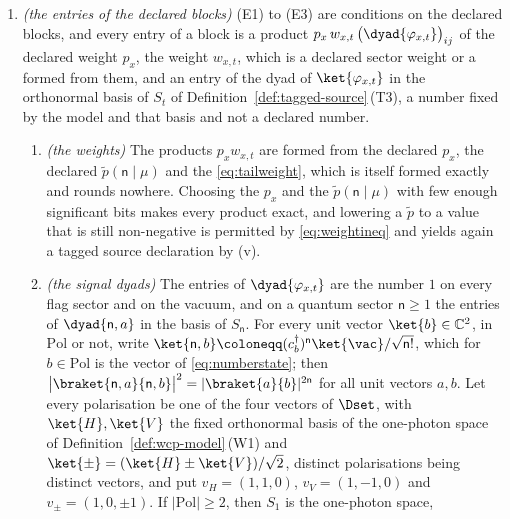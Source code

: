 \begin{corollary}
\begin{enumerate}[label=(\roman*),leftmargin=3.0em]
pinching $A$ along $\mathbb{T}$ after the attack is the same operation as
pinching the virtual signal before it (Lemma~\ref{lem:matched-pinching});
Theorem~\ref{thm:certificate-sufficiency}\,(iii) holds against the tagged ensemble of
Definition~\ref{def:tagged-source}\,(T4) itself;
and a positive operator constrained only to have the marginal $\tau_A$ need not
be block diagonal.
\item \emph{(the entries of the declared blocks)} (E1) to (E3) are conditions on
the declared blocks, and every entry of a block is a product
$p_x\,w_{x,t}\,\big(\dyad{\varphi_{x,t}}\big)_{ij}$ of the declared weight
$p_x$, the weight $w_{x,t}$, which is a declared sector weight or a
 formed from them, and an entry of the dyad of $\ket{\varphi_{x,t}}$ in the
orthonormal basis of $S_t$ of Definition~\ref{def:tagged-source}\,(T3), a
number fixed by the model and that basis and not a declared number.
\begin{enumerate}[label=(\alph*),leftmargin=2.2em]
\item \emph{(the weights)} The products $p_xw_{x,t}$ are formed from the
declared $p_x$, the declared $\tilde p(\mathsf{n}\mid\mu)$ and the
 \eqref{eq:tailweight}, which is itself formed exactly and rounds nowhere.
Choosing the $p_x$ and the $\tilde p(\mathsf{n}\mid\mu)$ with few enough
significant bits makes every product exact, and lowering a $\tilde p$ to a
value that is still non-negative is permitted by \eqref{eq:weightineq} and
yields again a tagged source declaration by (v).
\item \emph{(the signal dyads)} The entries of $\dyad{\varphi_{x,t}}$ are the
number $1$ on every flag sector and on the vacuum, and on a quantum sector
$\mathsf{n}\ge1$ the entries of $\dyad{\mathsf{n},a}$ in the basis of
$S_{\mathsf{n}}$. For every unit vector $\ket{b}\in\mathbb{C}^2$, in
$\mathrm{Pol}$ or not, write
$\ket{\mathsf{n},b}\coloneqq(c^{\dagger}_b)^{\mathsf{n}}\ket{\vac}/
\sqrt{\mathsf{n}!}$, which for $b\in\mathrm{Pol}$ is the vector of
\eqref{eq:numberstate}; then
$\big|\braket{\mathsf{n},a}{\mathsf{n},b}\big|^2=|\braket{a}{b}|^{2\mathsf{n}}$
for all unit vectors $a,b$. Let every polarisation be one of the four
vectors of $\Dset$, with $\ket{H},\ket{V}$ the fixed orthonormal basis of the
one-photon space of Definition~\ref{def:wcp-model}\,(W1) and
$\ket{\pm}=(\ket{H}\pm\ket{V})/\sqrt2$, distinct polarisations being distinct
vectors, and put $v_H=(1,1,0)$, $v_V=(1,-1,0)$ and $v_{\pm}=(1,0,\pm1)$. If
$|\mathrm{Pol}|\ge2$, then $S_1$ is the one-photon space,

\end{enumerate}
\end{enumerate}
\end{corollary}
